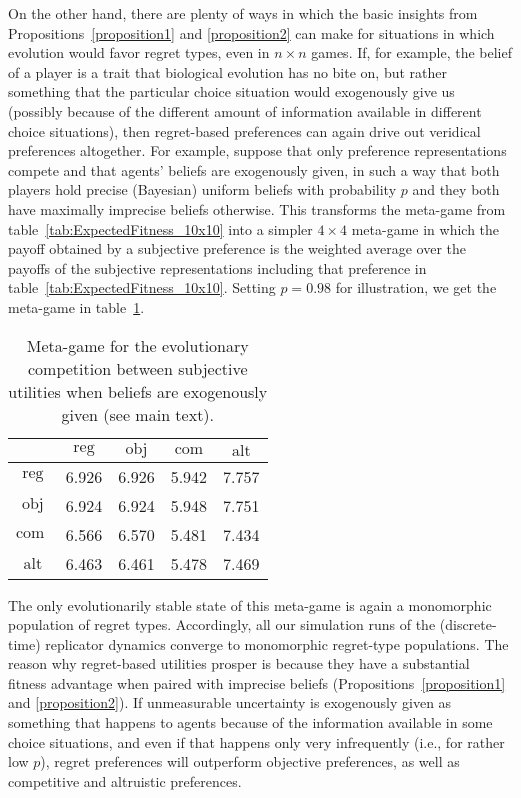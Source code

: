 \documentclass[fleqn,reqno,12pt]{article}
\theoremstyle{Satz}
\theoremstyle{Bsp}
\begin{document}
On the other hand, there are plenty of ways in which the basic insights from
Propositions~\ref{proposition1} and \ref{proposition2} can make for situations in which
evolution would favor regret types, even in $n \times n$ games. If, for example, the belief of
a player is a trait that biological evolution has no bite on, but rather something that the
particular choice situation would exogenously give us (possibly because of the different amount
of information available in different choice situations), then regret-based preferences can
again drive out veridical preferences altogether. For example, suppose that only preference representations
compete and that agents' beliefs are exogenously given, in such a way that both players hold
precise (Bayesian) uniform beliefs with probability $p$ and they both have maximally imprecise
beliefs otherwise. This transforms the meta-game from table~\ref{tab:ExpectedFitness_10x10}
into a simpler $4 \times 4$ meta-game in which the payoff obtained by a subjective preference is
the weighted average over the payoffs of the subjective representations including that preference
in table~\ref{tab:ExpectedFitness_10x10}. Setting $p = 0.98$ for illustration, we get the
meta-game in table~\ref{tab:ExogeneousEpistemics}.
\begin{table}[]
\centering
\begin{tabular}{ccccc}
  \toprule
  & $\text{reg}$ 
  & $\text{obj}$
  & $\text{com}$
  & $\text{alt}$ \\ 
  \midrule
  $\text{reg} $ & 6.926 & 6.926 & 5.942 & 7.757 \\ 
  $\text{obj} $ & 6.924 & 6.924 & 5.948 & 7.751 \\ 
  $\text{com }$ & 6.566 & 6.570 & 5.481 & 7.434 \\ 
  $\text{alt} $ & 6.463 & 6.461 & 5.478 & 7.469 \\ 
   \bottomrule
\end{tabular}
\caption{Meta-game for the evolutionary competition between subjective utilities when beliefs are exogenously
  given (see main text).}
\label{tab:ExogeneousEpistemics}
\end{table}
The only evolutionarily stable state of this meta-game is again a monomorphic population of regret types. Accordingly, all
our simulation runs of the (discrete-time) replicator dynamics converge to monomorphic
regret-type populations. The reason why regret-based utilities prosper is because they have a substantial
fitness advantage when paired with imprecise beliefs (Propositions~\ref{proposition1} and \ref{proposition2}). If unmeasurable uncertainty is exogenously given
as something that happens to agents because of the information available in some choice situations, and even if that happens only very infrequently
(i.e., for rather low $p$), regret preferences will outperform objective preferences, as
well as competitive and altruistic preferences.
\end{document}
